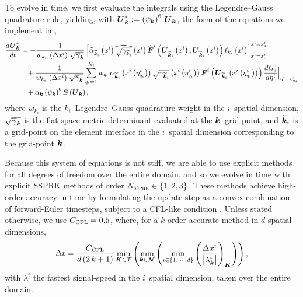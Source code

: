 To evolve  in time, we first evaluate the integrals using the
Legendre--Gauss quadrature rule, yielding, with
$\boldsymbol{U}^{*}_{\boldsymbol{k}}:=\left(\psi_{\boldsymbol{k}}\right)^{6}\,\boldsymbol{U}_{\boldsymbol{k}}$,
the form of the equations we implement in \thornado,
\begin{align}
\begin{split}
  &\frac{d\boldsymbol{U}^{*}_{\boldsymbol{k}}}{dt}
  =-\frac{1}{w_{k_{i}}\,\left(\Delta x^{i}\right)\,
  \sqrt{\overline{\gamma}_{\boldsymbol{k}}}}
  \left[\widehat{\alpha}_{\widetilde{\boldsymbol{k}}_{i}}\left(x^{i}\right)
  \widehat{\sqrt{\gamma_{\widetilde{\boldsymbol{k}}_{i}}}}\left(x^{i}\right)
  \widehat{\boldsymbol{F}}^{i}
  \left(\boldsymbol{U}_{\widetilde{\boldsymbol{k}}_{i}}^{-}\left(x^{i}\right),
  \boldsymbol{U}_{\widetilde{\boldsymbol{k}}_{i}}^{+}\left(x^{i}\right)\right)
  \ell_{k_{i}}\left(x^{i}\right)
  \right]^{x^{i}=x_{\textsc{h}}^{i}}_{x^{i}=x_{\textsc{l}}^{i}}\\
  &\hspace{3em}+\frac{1}{w_{k_{i}}\,\left(\Delta x^{i}\right)\,
  \sqrt{\overline{\gamma}_{\boldsymbol{k}}}}
  \sum\limits_{q_{i}=1}^{N_{i}}w_{q_{i}}\,
  \alpha_{\widetilde{\boldsymbol{k}}_{i}}
  \left(x^{i}\left(\eta^{i}_{q_{i}}\right)\right)
  \sqrt{\gamma_{\widetilde{\boldsymbol{k}}_{i}}}
  \left(x^{i}\left(\eta^{i}_{q_{i}}\right)\right)
  \boldsymbol{F}^{i}\left(\boldsymbol{U}_{\widetilde{\boldsymbol{k}}_{i}}
  \left(x^{i}\left(\eta^{i}_{q_{i}}\right)\right)\right)
  \frac{d\ell_{k_{i}}}{d\eta^{i}}\Big|_{\eta^{i}=\eta^{i}_{q_{i}}}\\
  &\hspace{3em}+\alpha_{\boldsymbol{k}}
  \left(\psi_{\boldsymbol{k}}\right)^{6}
  \boldsymbol{S}\left(\boldsymbol{U}_{\boldsymbol{k}}\right),
\end{split}
\label{eq.semiDis}
\end{align}
where $w_{k_{i}}$ is the $k_{i}$\myth\ Legendre--Gauss quadrature weight
in the $i$\myth\ spatial dimension,
$\sqrt{\overline{\gamma}_{\boldsymbol{k}}}$ is the flat-space metric determinant
evaluated at the $\boldsymbol{k}$\myth\ grid-point,
and $\widetilde{\boldsymbol{k}}_{i}$ is a grid-point on the element interface
in the $i$\myth\ spatial dimension corresponding to the grid-point $\boldsymbol{k}$.

Because this system of equations is not stiff, we are able to use
explicit methods for all degrees of freedom over the entire domain, and so we
evolve in time with explicit SSPRK
methods \citep[e.g., see][for a review]{gst2001} of order
$N_{\textsc{ssprk}}\in\left\{1,2,3\right\}$.
These methods achieve high-order accuracy in time by formulating the update
step as a convex combination of forward-Euler timesteps,
subject to a CFL-like condition
\citep{cs2001}.
Unless stated otherwise, we use $C_{\textsc{CFL}}=0.5$,
where, for a $k$\myth-order accurate method in $d$ spatial dimensions,
\begin{equation}
  \Delta t
  =\frac{C_{\textsc{CFL}}}{d\left(2\,k+1\right)}
  \min\limits_{\boldsymbol{K}\in\mathcal{T}}\left(
  \min\limits_{\boldsymbol{k}\in\boldsymbol{\mathcal{N}}}\left(
  \min\limits_{i\in\left\{1,\cdots,d\right\}}
  \left(\frac{\Delta x^{i}}
  {\left|\lambda^{i}_{\boldsymbol{k}}\right|}\right)_{\boldsymbol{K}}\right)\right),
\end{equation}
with $\lambda^{i}$ the fastest
signal-speed in the $i$\myth\ spatial dimension, taken over the entire domain.

